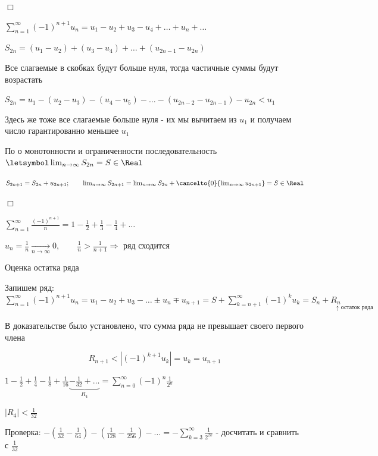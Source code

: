 \documentclass[12pt]{article}
\begin{document}
    \begin{MyProof}
        $\Box$

        $\sum_{n = 1}^\infty (-1)^{n + 1} u_n = u_1 - u_2 + u_3 - u_4 + \dots + u_n + \dots$

        $S_{2n} = (u_1 - u_2) + (u_3 - u_4) + \dots + (u_{2n - 1} - u_{2n})$

        Все слагаемые в скобках будут больше нуля, тогда частичные суммы будут возрастать

        $S_{2n} = u_1 - (u_2 - u_3) - (u_4 - u_5) - \dots - (u_{2n - 2} - u_{2n - 1}) - u_{2n} < u_1$

        Здесь же тоже все слагаемые больше нуля - их мы вычитаем из $u_1$ и получаем число гарантированно меньшее $u_1$

        По \Ths о монотонности и ограниченности последовательность $\letsymbol \lim_{n \to \infty} S_{2n} = S \in \Real$

        $S_{2n + 1} = S_{2n} + u_{2n + 1}; \qquad \lim_{n \to \infty} S_{2n + 1} = \lim_{n \to \infty} S_{2n} + \cancelto{0}{\lim_{n \to \infty} u_{2n + 1}} = S \in \Real$

        $\Box$
    \end{MyProof}

    \Exs $\sum_{n = 1}^\infty \frac{(-1)^{n + 1}}{n} = 1 - \frac{1}{2} + \frac{1}{3} - \frac{1}{4} + \dots$

    $u_n = \frac{1}{n} \underset{n \to \infty}{\longrightarrow} 0, \qquad \frac{1}{n} > \frac{1}{n + 1} \Longrightarrow$ ряд сходится

    \hypertarget{seriesremainderevaluation}{}

    \Nota Оценка остатка ряда

    Запишем ряд: $\sum_{n = 1}^\infty (-1)^{n + 1} u_n = u_1 - u_2 + u_3 - \dots \pm u_n \mp u_{n + 1} =
    S + \sum_{k = n + 1}^\infty (-1)^{k} u_k = S_n + \underset{\uparrow \text{ остаток ряда}}{R_n\phantom{ikkkkkkkk}}$

    В доказательстве \Ths было установлено, что сумма ряда не превышает своего первого члена

    \[R_{n + 1} < |(-1)^{k + 1} u_k| = u_k = u_{n + 1}\]

    \Ex $1 - \frac{1}{2} + \frac{1}{4} - \frac{1}{8} + \frac{1}{16} \underset{R_4}{\underbrace{ - \frac{1}{32} + \dots}} = \sum_{n = 0}^\infty (-1)^n \frac{1}{2^n}$

    $|R_4| < \frac{1}{32}$

    Проверка: $-\left(\frac{1}{32} - \frac{1}{64}\right) - \left(\frac{1}{128} - \frac{1}{256}\right) - \dots = -\sum_{k = 3}^\infty \frac{1}{2^{2k}}$ - \Lab досчитать и сравнить с $\frac{1}{32}$
\end{document}
